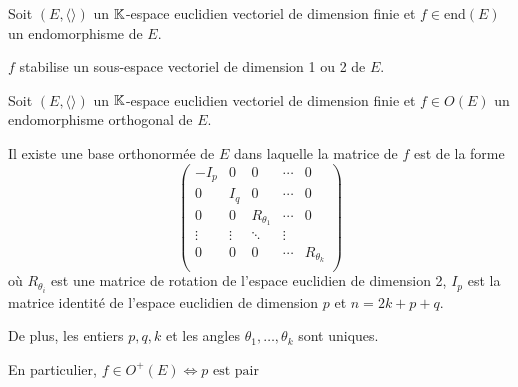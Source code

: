 \documentclass[a4paper, 12pt]{article}
\begin{document}
\begin{lemme}{}{}
    Soit $(E, \langle \rangle)$ un $\mathbb{K}$-espace euclidien vectoriel de dimension finie et $f \in \mathrm{end}(E)$ un endomorphisme de $E$.

    $f$ stabilise un sous-espace vectoriel de dimension 1 ou 2 de $E$.
\end{lemme}

\begin{theoreme}{}{}
    Soit $(E, \langle \rangle)$ un $\mathbb{K}$-espace euclidien vectoriel de dimension finie et $f \in O(E)$ un endomorphisme orthogonal de $E$.

    Il existe une base orthonormée de $E$ dans laquelle la matrice de $f$ est de la forme
    $$
    \begin{pmatrix}
        -I_p & 0 & 0 & \cdots & 0 \\
        0 & I_q & 0 & \cdots & 0 \\
        0 & 0 & R_{\theta_1} & \cdots & 0 \\
        \vdots & \vdots & \ddots & \vdots \\
        0 & 0 & 0 & \cdots & R_{\theta_k} \\
    \end{pmatrix}
    $$
    où $R_{\theta_i}$ est une matrice de rotation de l'espace euclidien de dimension 2, $I_p$ est la matrice identité de l'espace euclidien de dimension $p$ et $n = 2k + p + q$.

    De plus, les entiers $p, q, k$ et les angles $\theta_1, \ldots, \theta_k$ sont uniques.

    En particulier, $f \in O^+(E) \iff p \text{ est pair}$
\end{theoreme}
\end{document}
